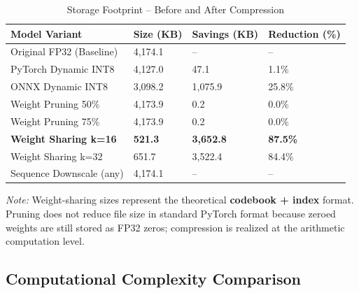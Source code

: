 \documentclass[12pt,a4paper]{article}
\begin{document}
\begin{table}[h!]
\centering
\caption{Storage Footprint -- Before and After Compression}
\renewcommand{\arraystretch}{1.4}
\begin{tabular}{L{4.5cm} R{2.2cm} R{2.2cm} R{2.2cm}}
\toprule
{}
\color{white}\textbf{Model Variant} &
\color{white}\textbf{Size (KB)} &
\color{white}\textbf{Savings (KB)} &
\color{white}\textbf{Reduction (\%)} \\
\midrule
Original FP32 (Baseline)     & 4,174.1 & --      & -- \\
PyTorch Dynamic INT8         & 4,127.0 &    47.1 &  1.1\% \\
ONNX Dynamic INT8            & 3,098.2 & 1,075.9 & 25.8\% \\
Weight Pruning 50\%          & 4,173.9 &     0.2 &  0.0\% \\
Weight Pruning 75\%          & 4,173.9 &     0.2 &  0.0\% \\
\textbf{Weight Sharing k=16} & \textbf{521.3}  & \textbf{3,652.8} & \textbf{87.5\%} \\
Weight Sharing k=32          &   651.7 & 3,522.4 & 84.4\% \\
Sequence Downscale (any)     & 4,174.1 &      -- &    -- \\
\bottomrule
\end{tabular}
\end{table}

\textit{Note:} Weight-sharing sizes represent the theoretical
\textbf{codebook + index} format.  Pruning does not reduce file size in
standard PyTorch format because zeroed weights are still stored as FP32
zeros; compression is realized at the arithmetic computation level.

\subsection{Computational Complexity Comparison}
\end{document}
